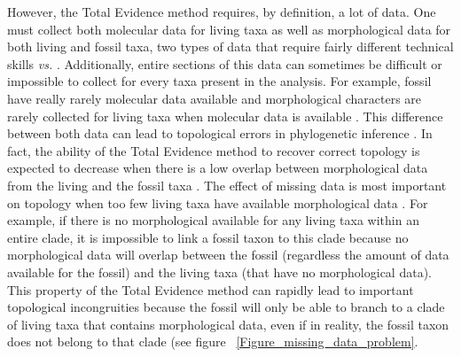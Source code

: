 \documentclass[12pt,letterpaper]{article}
\begin{document}
However, the Total Evidence method requires, by definition, a lot of data.
One must collect both molecular data for living taxa as well as morphological data for both living and fossil taxa, two types of data that require fairly different technical skills \citep[e.g.][]{meredithimpacts2011} \textit{vs.} \citep{O'Leary08022013}.
Additionally, entire sections of this data can sometimes be difficult or impossible to collect for every taxa present in the analysis.
For example, fossil have really rarely molecular data available and morphological characters are rarely collected for living taxa when molecular data is available \citep[e.g.][]{slaterphylogenetic2013,beckancient2014}.
This difference between both data can lead to topological errors in phylogenetic inference \citep{GuillermeCooper}.
In fact, the ability of the Total Evidence method to recover correct topology is expected to decrease when there is a low overlap between morphological data from the living and the fossil taxa \citep{GuillermeCooper}.
The effect of missing data is most important on topology when too few living taxa have available morphological data \citep{GuillermeCooper}.
For example, if there is no morphological available for any living taxa within an entire clade, it is impossible to link a fossil taxon to this clade because no morphological data will overlap between the fossil (regardless the amount of data available for the fossil) and the living taxa (that have no morphological data).
This property of the Total Evidence method can rapidly lead to important topological incongruities because the fossil will only be able to branch to a clade of living taxa that contains morphological data, even if in reality, the fossil taxon does not belong to that clade \citep{GuillermeCooper} (see figure ~\ref{Figure_missing_data_problem}.
\end{document}
